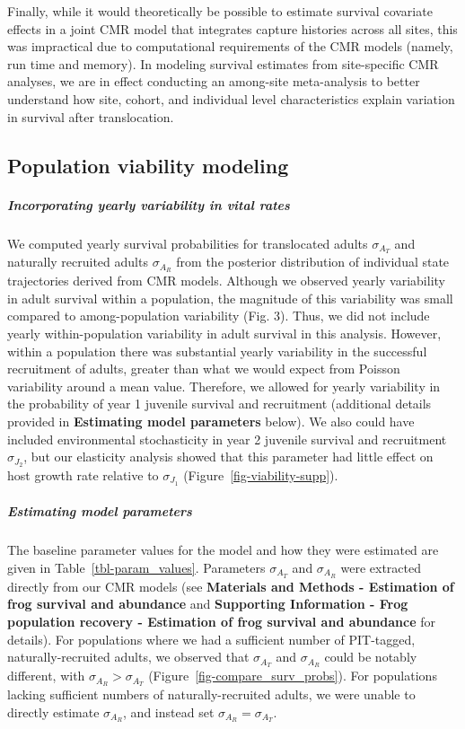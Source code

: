 \documentclass[9pt,twoside,lineno]{pnas-new}
\begin{document}
Finally, while it would theoretically be possible to estimate survival
covariate effects in a joint CMR model that integrates capture histories
across all sites, this was impractical due to computational requirements
of the CMR models (namely, run time and memory). In modeling survival
estimates from site-specific CMR analyses, we are in effect conducting
an among-site meta-analysis to better understand how site, cohort, and
individual level characteristics explain variation in survival after
translocation.

\hypertarget{population-viability-modeling-1}{%
\subsection{Population viability
modeling}\label{population-viability-modeling-1}}

\hypertarget{incorporating-yearly-variability-in-vital-rates}{%
\subparagraph{Incorporating yearly variability in vital
rates}\label{incorporating-yearly-variability-in-vital-rates}}

We computed yearly survival probabilities for translocated adults
\(\sigma_{A_T}\) and naturally recruited adults \(\sigma_{A_R}\) from
the posterior distribution of individual state trajectories derived from
CMR models. Although we observed yearly variability in adult survival
within a population, the magnitude of this variability was small
compared to among-population variability
(Fig. 3). Thus, we did not include
yearly within-population variability in adult survival in this analysis.
However, within a population there was substantial yearly variability in
the successful recruitment of adults, greater than what we would expect
from Poisson variability around a mean value. Therefore, we allowed for
yearly variability in the probability of year 1 juvenile survival and
recruitment (additional details provided in \textbf{Estimating model
parameters} below). We also could have included environmental
stochasticity in year 2 juvenile survival and recruitment
\(\sigma_{J_2}\), but our elasticity analysis showed that this parameter
had little effect on host growth rate relative to \(\sigma_{J_1}\)
(Figure~\ref{fig-viability-supp}).

\hypertarget{estimating-model-parameters}{%
\subparagraph{Estimating model
parameters}\label{estimating-model-parameters}}

The baseline parameter values for the model and how they were estimated
are given in Table~\ref{tbl-param_values}. Parameters \(\sigma_{A_T}\)
and \(\sigma_{A_R}\) were extracted directly from our CMR models (see
\textbf{Materials and Methods - Estimation of frog survival and
abundance} and \textbf{Supporting Information - Frog population recovery
- Estimation of frog survival and abundance} for details). For
populations where we had a sufficient number of PIT-tagged,
naturally-recruited adults, we observed that \(\sigma_{A_T}\) and
\(\sigma_{A_R}\) could be notably different, with
\(\sigma_{A_R} > \sigma_{A_T}\) (Figure~\ref{fig-compare_surv_probs}). For populations lacking sufficient numbers of naturally-recruited
adults, we were unable to directly estimate \(\sigma_{A_R}\), and
instead set \(\sigma_{A_R} = \sigma_{A_T}\).
\end{document}
